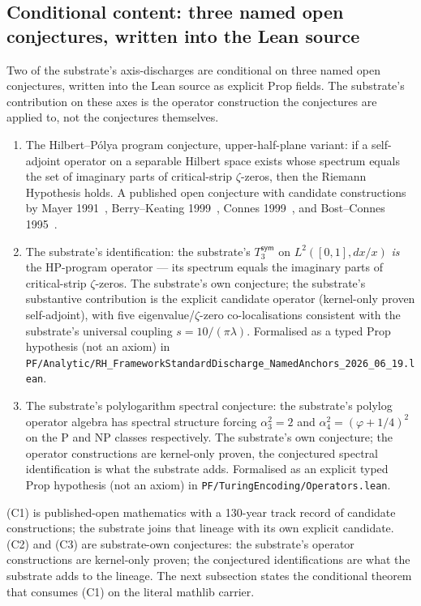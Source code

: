 \documentclass[11pt,a4paper]{amsart}
\theoremstyle{plain}
\theoremstyle{definition}
\begin{document}
\subsection{Conditional content: three named open conjectures, written into the Lean source}

Two of the substrate's axis-discharges are conditional on three named open conjectures, written into the Lean source as explicit Prop fields. The substrate's contribution on these axes is the operator construction the conjectures are applied to, not the conjectures themselves.

\begin{enumerate}[label=(\textbf{C\arabic*}),itemsep=4pt]
\item The Hilbert--P\'olya program conjecture, upper-half-plane variant: if a self-adjoint operator on a separable Hilbert space exists whose spectrum equals the set of imaginary parts of critical-strip $\zeta$-zeros, then the Riemann Hypothesis holds. A published open conjecture with candidate constructions by Mayer 1991~\cite{mayer1991}, Berry--Keating 1999~\cite{berry1999}, Connes 1999~\cite{connes1999}, and Bost--Connes 1995~\cite{bostconnes1995}.

\item The substrate's identification: the substrate's $T_3^{\textsf{sym}}$ on $L^2([0,1], dx/x)$ \emph{is} the HP-program operator --- its spectrum equals the imaginary parts of critical-strip $\zeta$-zeros. The substrate's own conjecture; the substrate's substantive contribution is the explicit candidate operator (kernel-only proven self-adjoint), with five eigenvalue/$\zeta$-zero co-localisations consistent with the substrate's universal coupling $s = 10/(\pi\lambda)$. Formalised as a typed Prop hypothesis (not an axiom) in \texttt{PF/Analytic/RH\_FrameworkStandardDischarge\_NamedAnchors\_2026\_06\_19.lean}.

\item The substrate's polylogarithm spectral conjecture: the substrate's polylog operator algebra has spectral structure forcing $\alpha_3^2 = 2$ and $\alpha_4^2 = (\varphi + 1/4)^2$ on the P and NP classes respectively. The substrate's own conjecture; the operator constructions are kernel-only proven, the conjectured spectral identification is what the substrate adds. Formalised as an explicit typed Prop hypothesis (not an axiom) in \texttt{PF/TuringEncoding/Operators.lean}.
\end{enumerate}

(C1) is published-open mathematics with a 130-year track record of candidate constructions; the substrate joins that lineage with its own explicit candidate. (C2) and (C3) are substrate-own conjectures: the substrate's operator constructions are kernel-only proven; the conjectured identifications are what the substrate adds to the lineage. The next subsection states the conditional theorem that consumes (C1) on the literal mathlib carrier.
\end{document}
